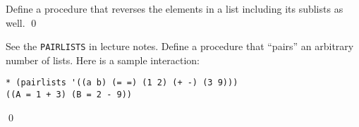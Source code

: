 \documentclass[a4paper,11pt]{article}
\begin{document}
\begin{uexercise}
Define a procedure that reverses the elements in a list including its sublists as well.
\qed
\end{uexercise}

\begin{uexercise}

See the \Verb+PAIRLISTS+ in lecture notes. Define a procedure that ``pairs'' an arbitrary number of lists. Here is a sample interaction:
{\small
\begin{Verbatim}
* (pairlists '((a b) (= =) (1 2) (+ -) (3 9)))
((A = 1 + 3) (B = 2 - 9))
\end{Verbatim}
}

\qed
\end{uexercise}


\newpage
\end{document}
